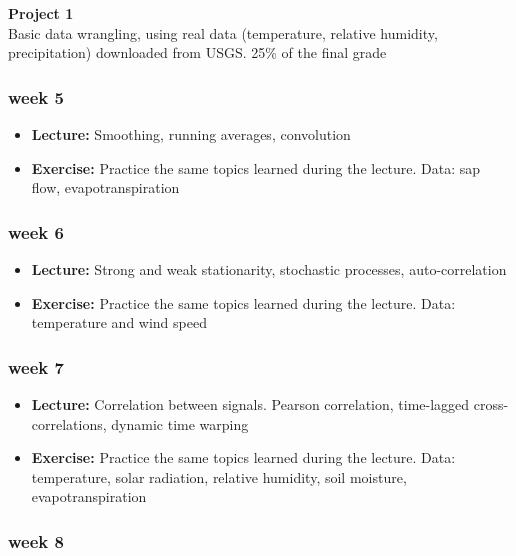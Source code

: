 \documentclass[
  letterpaper,
  DIV=11,
  numbers=noendperiod,
  oneside]{scrreprt}
\providecommand{\tightlist}{%
  \setlength{\itemsep}{0pt}\setlength{\parskip}{0pt}}\usepackage{longtable,booktabs,array}
\begin{document}
\textbf{Project 1}\\
Basic data wrangling, using real data (temperature, relative humidity,
precipitation) downloaded from USGS. 25\% of the final grade

\hypertarget{week-5}{%
\subsubsection*{week 5}\label{week-5}}

\begin{itemize}
\tightlist
\item
  \textbf{Lecture:} Smoothing, running averages, convolution
\item
  \textbf{Exercise:} Practice the same topics learned during the
  lecture. Data: sap flow, evapotranspiration
\end{itemize}

\hypertarget{week-6}{%
\subsubsection*{week 6}\label{week-6}}

\begin{itemize}
\tightlist
\item
  \textbf{Lecture:} Strong and weak stationarity, stochastic processes,
  auto-correlation
\item
  \textbf{Exercise:} Practice the same topics learned during the
  lecture. Data: temperature and wind speed
\end{itemize}

\hypertarget{week-7}{%
\subsubsection*{week 7}\label{week-7}}

\begin{itemize}
\tightlist
\item
  \textbf{Lecture:} Correlation between signals. Pearson correlation,
  time-lagged cross-correlations, dynamic time warping
\item
  \textbf{Exercise:} Practice the same topics learned during the
  lecture. Data: temperature, solar radiation, relative humidity, soil
  moisture, evapotranspiration
\end{itemize}

\hypertarget{week-8}{%
\subsubsection*{week 8}\label{week-8}}
\end{document}
